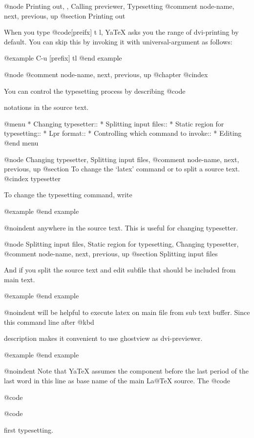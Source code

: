{{{@node Printing out,  , Calling previewer, Typesetting
@comment  node-name,  next,  previous,  up
@section Printing out

  When you type @code{[preifx] t l}, YaTeX asks you the range of
dvi-printing by default.  You can skip this by invoking it with
universal-argument as follows:

@example
        C-u [prefix] tl
@end example

@node %
@comment  node-name,  next,  previous,  up
@chapter %
@cindex %

  You can control the typesetting process by describing @code{%
notations in the source text.

@menu
* Changing typesetter::
* Splitting input files::
* Static region for typesetting::
* Lpr format::
* Controlling which command to invoke::
* Editing %
@end menu

@node Changing typesetter, Splitting input files, %
@comment  node-name,  next,  previous,  up
@section To change the `latex' command or to split a source text.
@cindex typesetter

  To change the typesetting command, write

@example
@end example

@noindent
anywhere in the source text.  This is useful for changing
typesetter.

@node Splitting input files, Static region for typesetting, Changing typesetter, %
@comment  node-name,  next,  previous,  up
@section Splitting input files

  And if you split the source text and
edit subfile that should be included from main text.

@example
@end example

@noindent
will be helpful to execute latex on main file from sub text buffer.  Since
this command line after @kbd{%
description makes it convenient to use ghostview as dvi-previewer.

@example
@end example

@noindent
Note that YaTeX  assumes the component  before the  last period of
the last word in this line as base name of the main La@TeX{} source.
The @code{%
@code{%
@code{%
first typesetting.

}}}}}}}}
